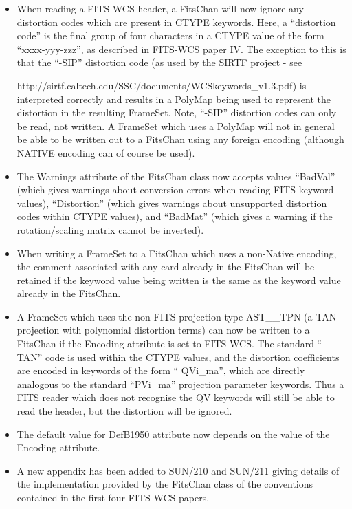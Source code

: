 \documentclass[twoside,11pt]{article}
\newcommand{\htmladdnormallink}[2]{#1}
\begin{document}
\begin{enumerate}
\begin{itemize}
\item When reading a FITS-WCS header, a FitsChan will now ignore any
distortion codes which are present in CTYPE keywords. Here, a ``distortion 
code'' is the final group of four characters in a CTYPE value of the
form ``xxxx-yyy-zzz'', as described in FITS-WCS paper IV. The exception
to this is that the ``-SIP'' distortion code (as used by the SIRTF
project - see 
\htmladdnormallink{
http://sirtf.caltech.edu/SSC/documents/WCSkeywords\_v1.3.pdf}{
http://sirtf.caltech.edu/SSC/documents/WCSkeywords\_v1.3.pdf}) is
interpreted correctly and results in a PolyMap being used to represent
the distortion in the resulting FrameSet. Note, ``-SIP'' distortion codes
can only be read, not written. A FrameSet which uses a PolyMap will not
in general be able to be written out to a FitsChan using any foreign
encoding (although NATIVE encoding can of course be used).

\item The Warnings attribute of the FitsChan class now accepts values 
``BadVal'' (which gives warnings about conversion errors when reading 
FITS keyword values), ``Distortion'' (which gives warnings about
unsupported distortion codes within CTYPE values), and ``BadMat'' (which
gives a warning if the rotation/scaling matrix cannot be inverted).

\item When writing a FrameSet to a FitsChan which uses a non-Native
encoding, the comment associated with any card already in the FitsChan
will be retained if the keyword value being written is the same as the
keyword value already in the FitsChan.

\item A FrameSet which uses the non-FITS projection type AST\_\_TPN (a TAN 
projection with polynomial distortion terms) can now be written to a 
FitsChan if the Encoding attribute is set to FITS-WCS. The standard
``-TAN'' code is used within the CTYPE values, and the distortion
coefficients are encoded in keywords of the form `` QVi\_ma'', which are 
directly analogous to the standard ``PVi\_ma'' projection parameter keywords.
Thus a FITS reader which does not recognise the QV keywords will still
be able to read the header, but the distortion will be ignored.

\item The default value for DefB1950 attribute now depends on the value
of the Encoding attribute. 

\item A new appendix has been added to SUN/210 and SUN/211 giving details
of the implementation provided by the FitsChan class of the
conventions contained in the first four FITS-WCS papers.
\end{itemize}


\end{enumerate}
\end{document}
